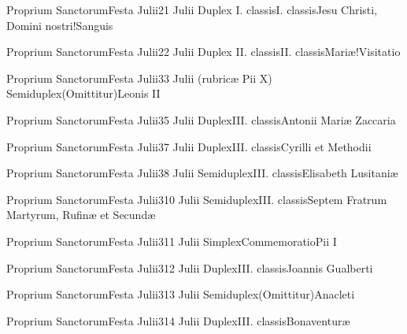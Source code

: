 \documentclass[psalterium-feriale.tex]{subfiles}
\begin{document}
	{Proprium Sanctorum}{Festa Julii}{2}{1 Julii}
	{Duplex I. classis}{I. classis}{Jesu Christi, Domini nostri!Sanguis}
	{}
	{}
\psalmodiapropria

	{Proprium Sanctorum}{Festa Julii}{2}{2 Julii}
	{Duplex II. classis}{II. classis}{Mariæ!Visitatio}
	{}
	{}
\psalmodiapropria

	{Proprium Sanctorum}{Festa Julii}{3}{3 Julii (rubricæ Pii X)}
	{Semiduplex}{(Omittitur)}{Leonis II}
	{}
	{}
\COPOaRubric

	{Proprium Sanctorum}{Festa Julii}{3}{5 Julii}
	{Duplex}{III. classis}{Antonii Mariæ Zaccaria}
	{}
	{}
\COPObRubric

	{Proprium Sanctorum}{Festa Julii}{3}{7 Julii}
	{Duplex}{III. classis}{Cyrilli et Methodii}
	{}
	{}

	{Proprium Sanctorum}{Festa Julii}{3}{8 Julii}
	{Semiduplex}{III. classis}{Elisabeth Lusitaniæ}
	{}
	{}

	{Proprium Sanctorum}{Festa Julii}{3}{10 Julii}
	{Semiduplex}{III. classis}{Septem Fratrum Martyrum, Rufinæ et Secundæ}
	{}
	{}
\UMEXbRubric

	{Proprium Sanctorum}{Festa Julii}{3}{11 Julii}
	{Simplex}{Commemoratio}{Pii I}
	{}
	{}
\UMEXaRubric

	{Proprium Sanctorum}{Festa Julii}{3}{12 Julii}
	{Duplex}{III. classis}{Joannis Gualberti}
	{}
	{}
\COPObRubric

	{Proprium Sanctorum}{Festa Julii}{3}{13 Julii}
	{Semiduplex}{(Omittitur)}{Anacleti}
	{}
	{}
\UMEXaRubric

	{Proprium Sanctorum}{Festa Julii}{3}{14 Julii}
	{Duplex}{III. classis}{Bonaventuræ}
	{}
	{}
\COPOcRubric
\end{document}

